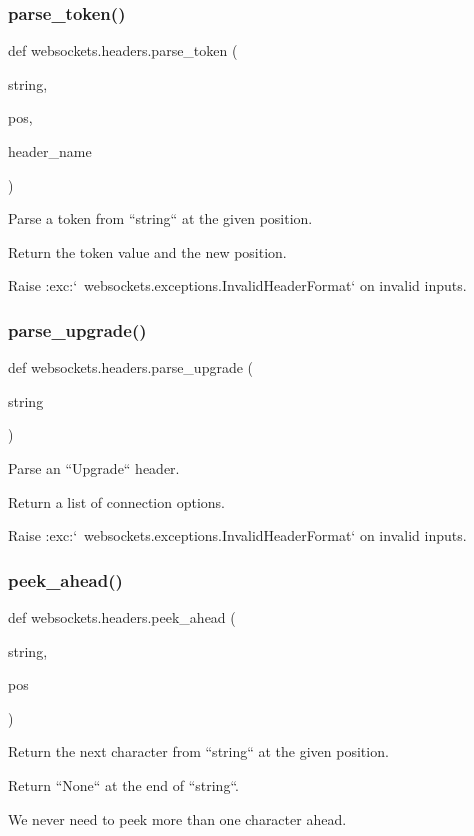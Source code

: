 \subsubsection{\texorpdfstring{parse\+\_\+token()}{parse\_token()}}
{\footnotesize\ttfamily def websockets.\+headers.\+parse\+\_\+token (\begin{DoxyParamCaption}\item[{}]{string,  }\item[{}]{pos,  }\item[{}]{header\+\_\+name }\end{DoxyParamCaption})}

\begin{DoxyVerb}Parse a token from ``string`` at the given position.

Return the token value and the new position.

Raise :exc:`~websockets.exceptions.InvalidHeaderFormat` on invalid inputs.\end{DoxyVerb}
 \mbox{\label{namespacewebsockets_1_1headers_a29f24b4011fc6e1958da1f8585b5db37}} 
\subsubsection{\texorpdfstring{parse\+\_\+upgrade()}{parse\_upgrade()}}
{\footnotesize\ttfamily def websockets.\+headers.\+parse\+\_\+upgrade (\begin{DoxyParamCaption}\item[{}]{string }\end{DoxyParamCaption})}

\begin{DoxyVerb}Parse an ``Upgrade`` header.

Return a list of connection options.

Raise :exc:`~websockets.exceptions.InvalidHeaderFormat` on invalid inputs.\end{DoxyVerb}
 \mbox{\label{namespacewebsockets_1_1headers_a1110b931117dfe61db33cd7c03370610}} 
\subsubsection{\texorpdfstring{peek\+\_\+ahead()}{peek\_ahead()}}
{\footnotesize\ttfamily def websockets.\+headers.\+peek\+\_\+ahead (\begin{DoxyParamCaption}\item[{}]{string,  }\item[{}]{pos }\end{DoxyParamCaption})}

\begin{DoxyVerb}Return the next character from ``string`` at the given position.

Return ``None`` at the end of ``string``.

We never need to peek more than one character ahead.\end{DoxyVerb}
 